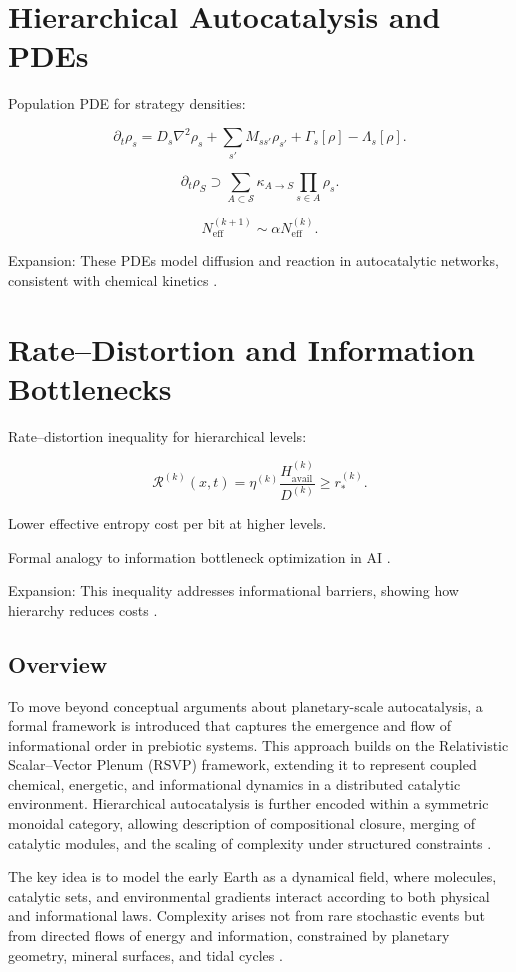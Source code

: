\documentclass[openany]{book}
\begin{document}
\chapter{Hierarchical Autocatalysis and PDEs}
Population PDE for strategy densities:

\[\partial_t \rho_s = D_s \nabla^2 \rho_s + \sum_{s'} M_{s s'} \rho_{s'} + \Gamma_s[\rho] - \Lambda_s[\rho].\]

\[\partial_t \rho_{S} \supset \sum_{A\subset \mathcal{S}} \kappa_{A\to S}\prod_{s\in A}\rho_s.\]

\[N_{\mathrm{eff}}^{(k+1)} \sim \alpha N_{\mathrm{eff}}^{(k)}.\]

Expansion: These PDEs model diffusion and reaction in autocatalytic networks, consistent with chemical kinetics \citep{hordijk2010}.

\chapter{Rate–Distortion and Information Bottlenecks}
Rate–distortion inequality for hierarchical levels:

\[\mathcal{R}^{(k)}(x,t) = \eta^{(k)} \frac{H^{(k)}_{\mathrm{avail}}}{D^{(k)}} \ge r_\ast^{(k)}.\]

Lower effective entropy cost per bit at higher levels.

Formal analogy to information bottleneck optimization in AI \citep{scalinghypothesis}.

Expansion: This inequality addresses informational barriers, showing how hierarchy reduces costs \citep{endres2025}.

\section{Overview}
To move beyond conceptual arguments about planetary-scale autocatalysis, a formal framework is introduced that captures the emergence and flow of informational order in prebiotic systems. This approach builds on the Relativistic Scalar–Vector Plenum (RSVP) framework, extending it to represent coupled chemical, energetic, and informational dynamics in a distributed catalytic environment. Hierarchical autocatalysis is further encoded within a symmetric monoidal category, allowing description of compositional closure, merging of catalytic modules, and the scaling of complexity under structured constraints \citep{hordijk2013, steel2013}.

The key idea is to model the early Earth as a dynamical field, where molecules, catalytic sets, and environmental gradients interact according to both physical and informational laws. Complexity arises not from rare stochastic events but from directed flows of energy and information, constrained by planetary geometry, mineral surfaces, and tidal cycles \citep{plum2025}.
\end{document}

